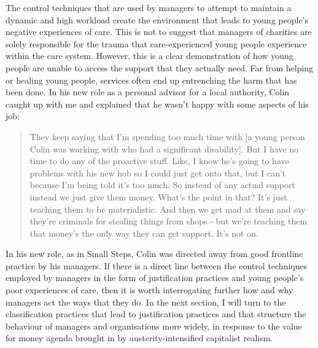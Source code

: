 The control techniques that are used by managers to attempt to maintain a dynamic and high workload create the environment that leads to young people's negative experiences of care. This is not to suggest that managers of charities are solely responsible for the trauma that care-experienced young people experience within the care system. However, this is a clear demonstration of how young people are unable to access the support that they actually need. Far from helping or healing young people, services often end up entrenching the harm that has been done. In his new role as a personal advisor for a local authority, Colin caught up with me and explained that he wasn't happy with some aspects of his job:
\begin{quote}
They keep saying that I'm spending too much time with [a young person Colin was working with who had a significant disability]. But I have no time to do any of the proactive stuff. Like, I know he's going to have problems with his new hob so I could just get onto that, but I can't because I'm being told it's too much. So instead of any actual support instead we just give them money. What's the point in that? It's just teaching them to be materialistic. And then we get mad at them and say they're criminals for stealing things from shops - but we're teaching them that money's the only way they can get support. It's not on.
\end{quote}
In his new role, as in Small Steps, Colin was directed away from good frontline practice by his managers. If there is a direct line between the control techniques employed by managers in the form of justification practices and young people's poor experiences of care, then it is worth interrogating further how and why managers act the ways that they do. In the next section, I will turn to the classification practices that lead to justification practices and that structure the behaviour of managers and organisations more widely, in response to the value for money agenda brought in by austerity-intensified capitalist realism.

